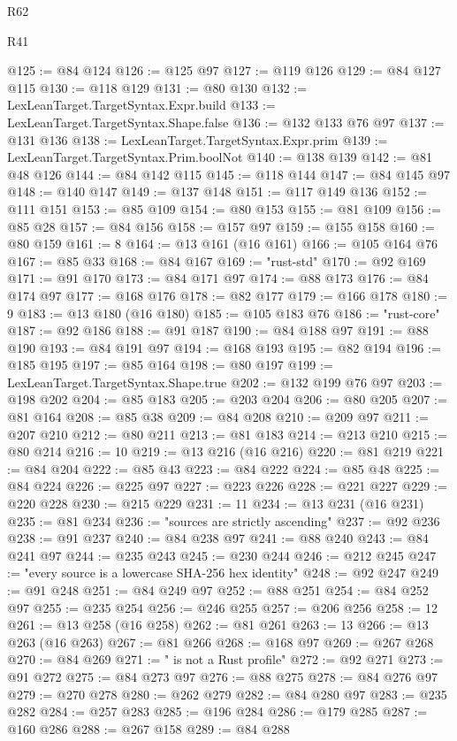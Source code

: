 \begin{lexlean}{R62}
\begin{lexlean}{R41}
\begin{coremodule}
{{{{{{{{{{{{{{{{{{{{{{{{{{{{{{{{{{{{{{{{{{{{{{{{{{{{{{{{{{{{{{{{{{{{{{{{{{{{{{{{{{{{{{{@125 := @84 @124
@126 := @125 @97
@127 := @119 @126
@129 := @84 @127 @115
@130 := @118 @129
@131 := @80 @130
@132 := LexLeanTarget.TargetSyntax.Expr.build
@133 := LexLeanTarget.TargetSyntax.Shape.false
@136 := @132 @133 @76 @97
@137 := @131 @136
@138 := LexLeanTarget.TargetSyntax.Expr.prim
@139 := LexLeanTarget.TargetSyntax.Prim.boolNot
@140 := @138 @139
@142 := @81 @48 @126
@144 := @84 @142 @115
@145 := @118 @144
@147 := @84 @145 @97
@148 := @140 @147
@149 := @137 @148
@151 := @117 @149 @136
@152 := @111 @151
@153 := @85 @109
@154 := @80 @153
@155 := @81 @109
@156 := @85 @28
@157 := @84 @156
@158 := @157 @97
@159 := @155 @158
@160 := @80 @159
@161 := 8
@164 := @13 @161 (@16 @161)
@166 := @105 @164 @76
@167 := @85 @33
@168 := @84 @167
@169 := "rust-std"
@170 := @92 @169
@171 := @91 @170
@173 := @84 @171 @97
@174 := @88 @173
@176 := @84 @174 @97
@177 := @168 @176
@178 := @82 @177
@179 := @166 @178
@180 := 9
@183 := @13 @180 (@16 @180)
@185 := @105 @183 @76
@186 := "rust-core"
@187 := @92 @186
@188 := @91 @187
@190 := @84 @188 @97
@191 := @88 @190
@193 := @84 @191 @97
@194 := @168 @193
@195 := @82 @194
@196 := @185 @195
@197 := @85 @164
@198 := @80 @197
@199 := LexLeanTarget.TargetSyntax.Shape.true
@202 := @132 @199 @76 @97
@203 := @198 @202
@204 := @85 @183
@205 := @203 @204
@206 := @80 @205
@207 := @81 @164
@208 := @85 @38
@209 := @84 @208
@210 := @209 @97
@211 := @207 @210
@212 := @80 @211
@213 := @81 @183
@214 := @213 @210
@215 := @80 @214
@216 := 10
@219 := @13 @216 (@16 @216)
@220 := @81 @219
@221 := @84 @204
@222 := @85 @43
@223 := @84 @222
@224 := @85 @48
@225 := @84 @224
@226 := @225 @97
@227 := @223 @226
@228 := @221 @227
@229 := @220 @228
@230 := @215 @229
@231 := 11
@234 := @13 @231 (@16 @231)
@235 := @81 @234
@236 := "sources are strictly ascending"
@237 := @92 @236
@238 := @91 @237
@240 := @84 @238 @97
@241 := @88 @240
@243 := @84 @241 @97
@244 := @235 @243
@245 := @230 @244
@246 := @212 @245
@247 := "every source is a lowercase SHA-256 hex identity"
@248 := @92 @247
@249 := @91 @248
@251 := @84 @249 @97
@252 := @88 @251
@254 := @84 @252 @97
@255 := @235 @254
@256 := @246 @255
@257 := @206 @256
@258 := 12
@261 := @13 @258 (@16 @258)
@262 := @81 @261
@263 := 13
@266 := @13 @263 (@16 @263)
@267 := @81 @266
@268 := @168 @97
@269 := @267 @268
@270 := @84 @269
@271 := " is not a Rust profile"
@272 := @92 @271
@273 := @91 @272
@275 := @84 @273 @97
@276 := @88 @275
@278 := @84 @276 @97
@279 := @270 @278
@280 := @262 @279
@282 := @84 @280 @97
@283 := @235 @282
@284 := @257 @283
@285 := @196 @284
@286 := @179 @285
@287 := @160 @286
@288 := @267 @158
@289 := @84 @288
}}}}}}}}}}}}}}}}}}}}}}}}}}}}}}}}}}}}}}}}}}}}}}}}}}}}}}}}}}}}}}}}}}}}}}}}}}}}}}}}}}}}}}}
\end{coremodule}
\end{lexlean}
\end{lexlean}
